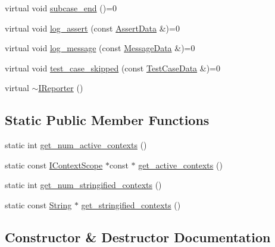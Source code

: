 \begin{DoxyCompactItemize}
virtual void \hyperlink{structdoctest_1_1_i_reporter_a05196dd1a5f7e40e8c734cd2a37d4e1e}{subcase\+\_\+end} ()=0
\item 
virtual void \hyperlink{structdoctest_1_1_i_reporter_a5bb54923eab233bb02f2fcfc178fa12a}{log\+\_\+assert} (const \hyperlink{structdoctest_1_1_assert_data}{Assert\+Data} \&)=0
\item 
virtual void \hyperlink{structdoctest_1_1_i_reporter_a2b2cb4f15aa7417d4903a0edc3147018}{log\+\_\+message} (const \hyperlink{structdoctest_1_1_message_data}{Message\+Data} \&)=0
\item 
virtual void \hyperlink{structdoctest_1_1_i_reporter_ab4ecfea9cd9582aad4a5e90e0c8ba45d}{test\+\_\+case\+\_\+skipped} (const \hyperlink{structdoctest_1_1_test_case_data}{Test\+Case\+Data} \&)=0
\item 
virtual \hyperlink{structdoctest_1_1_i_reporter_ae772182e42f2a3b163497f2b8bc3636d}{$\sim$\+I\+Reporter} ()
\end{DoxyCompactItemize}
\subsection*{Static Public Member Functions}
\begin{DoxyCompactItemize}
\item 
static int \hyperlink{structdoctest_1_1_i_reporter_a7d520de46d9104c0eeb02375fabad32d}{get\+\_\+num\+\_\+active\+\_\+contexts} ()
\item 
static const \hyperlink{structdoctest_1_1_i_context_scope}{I\+Context\+Scope} $\ast$const  $\ast$ \hyperlink{structdoctest_1_1_i_reporter_a67a2da62d754d3b517d6d50ef210a988}{get\+\_\+active\+\_\+contexts} ()
\item 
static int \hyperlink{structdoctest_1_1_i_reporter_ac8b96fef046edc609a3374a61b84797d}{get\+\_\+num\+\_\+stringified\+\_\+contexts} ()
\item 
static const \hyperlink{classdoctest_1_1_string}{String} $\ast$ \hyperlink{structdoctest_1_1_i_reporter_acc1a86891876a957c6fc382af7894f99}{get\+\_\+stringified\+\_\+contexts} ()
\end{DoxyCompactItemize}


\subsection{Constructor \& Destructor Documentation}
\mbox{\label{structdoctest_1_1_i_reporter_ae772182e42f2a3b163497f2b8bc3636d}} 
